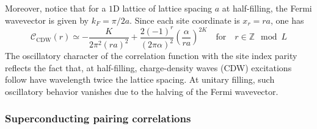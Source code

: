 Moreover, notice that for a $1$D lattice of lattice spacing $a$ at half-filling, the Fermi wavevector is given by $k_F = \pi/2a$. Since each site coordinate is $x_r=ra$, one has
\[
	\mathcal{C}_\mathrm{CDW}(r) \simeq - \frac{K}{2\pi^2 (ra)^2} +  \frac{2 (-1)^r }{(2\pi\alpha)^2} \left(
	\frac{\alpha}{ra}
	\right)^{2K}
	\quad\text{for}\quad
	r \in \mathbb{Z} \mod L
\]
The oscillatory character of the correlation function with the site index parity reflects the fact that, at half-filling, charge-density waves (CDW) excitations follow have wavelength twice the lattice spacing. At unitary filling, such oscillatory behavior vanishes due to the halving of the Fermi wavevector.

\subsubsection{Superconducting pairing correlations}

